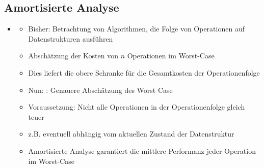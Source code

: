 \documentclass[
    12pt,
    a4paper,
    ngerman,
    color=3b,%
    marginpar=false,
    colorback=false,
    leqno,
]{tudaexercise}
\begin{document}
\subsection{Amortisierte Analyse}
    \begin{itemize}
        \vspace*{-.2cm}
        \item {}
            \begin{itemize}
                \item Bisher: Betrachtung von Algorithmen, die Folge von Operationen auf Datenstrukturen ausführen
                \item Abschätzung der Kosten von $n$ Operationen im Worst-Case
                \item Dies liefert die obere Schranke für die Gesamtkosten der Operationenfolge
                \item Nun: : Genauere Abschätzung des Worst Case
                \item Voraussetzung: Nicht alle Operationen in der Operationenfolge gleich teuer
                \item z.B. eventuell abhängig vom aktuellen Zustand der Datenstruktur
                \item Amortisierte Analyse garantiert die mittlere Performanz jeder Operation im Worst-Case
            \end{itemize}


\end{itemize}
\end{document}
